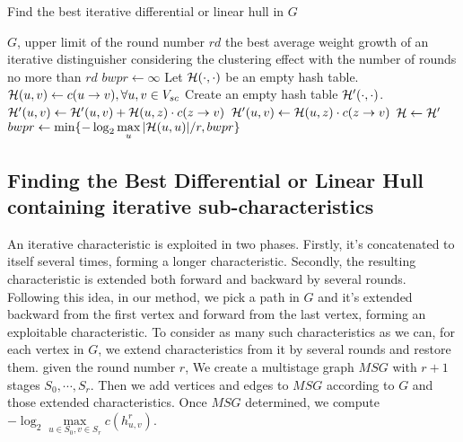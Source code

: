 \begin{algorithm}
	\caption{Find the best iterative differential or linear hull in $G$}
	\label{algo:find-ite-h}
	\begin{algorithmic}[1]
        \Require $G$, upper limit of the round number $rd$
        \Ensure the best average weight growth of an iterative distinguisher considering the clustering effect with the number of rounds no more than $rd$
        \Procedure {}{}
        \State $bwpr\leftarrow\infty$
        \State Let $\mathcal{H}(\cdot,\cdot)$ be an empty hash table. 
        \State $\mathcal{H}(u,v)\leftarrow c(u\rightarrow v),\forall u,v\in V_{sc}$
        \State Create an empty hash table $\mathcal{H}'(\cdot,\cdot)$.
        \State $\mathcal{H}'(u,v)\leftarrow\mathcal{H}'(u,v)+\mathcal{H}(u,z)\cdot c(z\rightarrow v)$
        \Else
        \State $\mathcal{H}'(u,v)\leftarrow\mathcal{H}(u,z)\cdot c(z\rightarrow v)$
        \EndIf
        \EndFor
        \State $\mathcal{H}\leftarrow \mathcal{H}'$
        \EndFor
        \State $bwpr\leftarrow \min\{-\log_2\max\limits_{u}|\mathcal{H}(u,u)|/r,bwpr\}$
        \EndFor
        \EndFor
        \State {}
        \EndProcedure
	\end{algorithmic}
\end{algorithm}

\subsection{Finding the Best Differential or Linear Hull containing iterative sub-characteristics}\label{sec:method-edp-elp}

An iterative characteristic is exploited in two phases. Firstly, it's concatenated to itself several times, forming a longer characteristic. Secondly, the resulting characteristic is extended both forward and backward by several rounds. Following this idea, in our method, we pick a path in $G$ and it's extended backward from the first vertex and forward from the last vertex, forming an exploitable characteristic. To consider as many such characteristics as we can, for each vertex in $G$, we extend characteristics from it by several rounds and restore them. given the round number $r$, We create a multistage graph $MSG$ with $r+1$ stages $S_0,\cdots,S_r$. Then we add vertices and edges to $MSG$ according to $G$ and those extended characteristics. Once $MSG$ determined, we compute $-\log_2\max\limits_{u\in S_0,v\in S_r}c(h^r_{u,v})$. 

